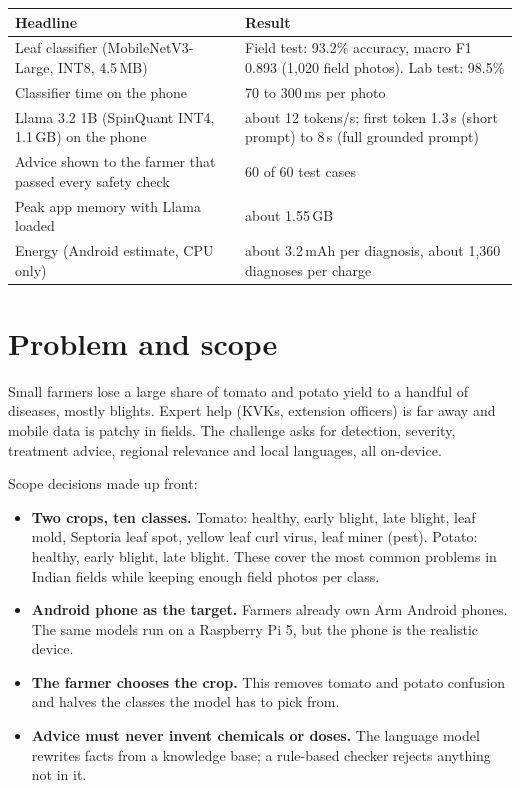 \documentclass[11pt,a4paper]{article}
\newcommand{\hdr}[1]{\textbf{#1}}
\begin{document}
\begin{table}[H]
\centering
\begin{tabularx}{\textwidth}{@{}L L@{}}
\toprule
\hdr{Headline} & \hdr{Result} \\
\midrule
Leaf classifier (MobileNetV3-Large, INT8, 4.5\,MB) & Field test: 93.2\% accuracy, macro F1 0.893 (1,020 field photos). Lab test: 98.5\% \\
Classifier time on the phone & 70 to 300\,ms per photo \\
Llama 3.2 1B (SpinQuant INT4, 1.1\,GB) on the phone & about 12 tokens/s; first token 1.3\,s (short prompt) to 8\,s (full grounded prompt) \\
Advice shown to the farmer that passed every safety check & 60 of 60 test cases \\
Peak app memory with Llama loaded & about 1.55\,GB \\
Energy (Android estimate, CPU only) & about 3.2\,mAh per diagnosis, about 1,360 diagnoses per charge \\
\bottomrule
\end{tabularx}
\end{table}

\section{Problem and scope}

Small farmers lose a large share of tomato and potato yield to a handful of
diseases, mostly blights. Expert help (KVKs, extension officers) is far away and
mobile data is patchy in fields. The challenge asks for detection, severity,
treatment advice, regional relevance and local languages, all on-device.

Scope decisions made up front:

\begin{itemize}
  \item \textbf{Two crops, ten classes.} Tomato: healthy, early blight, late
        blight, leaf mold, Septoria leaf spot, yellow leaf curl virus, leaf miner
        (pest). Potato: healthy, early blight, late blight. These cover the most
        common problems in Indian fields while keeping enough field photos per class.
  \item \textbf{Android phone as the target.} Farmers already own Arm Android
        phones. The same models run on a Raspberry Pi 5, but the phone is the
        realistic device.
  \item \textbf{The farmer chooses the crop.} This removes tomato and potato
        confusion and halves the classes the model has to pick from.
  \item \textbf{Advice must never invent chemicals or doses.} The language model
        rewrites facts from a knowledge base; a rule-based checker rejects
        anything not in it.
\end{itemize}
\end{document}

